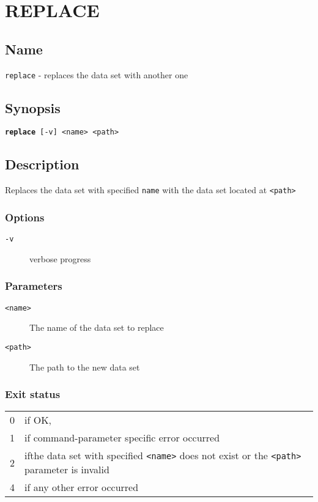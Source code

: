 \documentclass{article} %
\begin{document}
		\newpage
		\section*{REPLACE}
		\subsection*{Name}
		\texttt{replace} - replaces the data set with another one
		\subsection*{Synopsis}
		\texttt{\textbf{replace} [-v] <name> <path>}
		\subsection*{Description}
		Replaces the data set with specified \texttt{name} with the data set located at \texttt{<path>}\\
		
		\noindent
		\subsubsection*{Options}
		\begin{description}
			\item[\texttt{-v}] verbose progress
		\end{description}
		
		\subsubsection*{Parameters}
		\begin{description}
			\item[\texttt{<name>}] The name of the data set to replace
			\item[\texttt{<path>}] The path to the new data set
		\end{description}
		\subsubsection*{Exit status}
		\begin{tabular}{ll}
			0 &  if OK,\\ 
			1 &  if command-parameter specific error occurred\\
			2 &  ifthe data set with specified \texttt{<name>} does not exist or the \texttt{<path>} parameter is invalid\\
			4 &  if any other error occurred\\
		\end{tabular}
		\newpage
\end{document}
